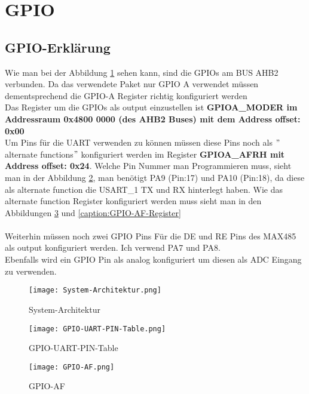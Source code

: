 \newpage
\section{GPIO}
    \subsection{GPIO-Erklärung}
    Wie man bei der Abbildung \ref{caption:System-Architektur} sehen kann, sind die GPIOs am BUS AHB2 verbunden. 
    Da das verwendete Paket nur GPIO A verwendet müssen dementsprechend die GPIO-A Register richtig konfiguriert werden\\
    Das Register um die GPIOs als output einzustellen ist \textbf{GPIOA\_MODER im Addressraum 0x4800 0000 (des AHB2 Buses) mit dem Address offset: 0x00}\\
    Um Pins für die UART verwenden zu können müssen diese Pins noch als $"$alternate functions$"$ konfiguriert werden im Register \textbf{GPIOA\_AFRH mit Address offset: 0x24}.
    Welche Pin Nummer man Programmieren muss, sieht man in der Abbildung \ref{caption:GPIO-UART-PIN-Table}, man benötigt PA9 (Pin:17) und PA10 (Pin:18), da diese als alternate function
    die USART\_1 TX und RX hinterlegt haben. Wie das alternate function Register konfiguriert werden muss sieht man in den Abbildungen \ref{caption:GPIO-AF} 
    und \ref{caption:GPIO-AF-Register}\\\\
    Weiterhin müssen noch zwei GPIO Pins Für die DE und RE Pins des MAX485 als output konfiguriert werden. Ich verwend PA7 und PA8.\\
    Ebenfalls wird ein GPIO Pin als analog konfiguriert um diesen als ADC Eingang zu verwenden. 
    

    \begin{figure}[!htb]
        \centering
        \texttt{[image: System-Architektur.png]}
        \caption{System-Architektur}
        \label{caption:System-Architektur}
    \end{figure}

\newpage
    \begin{figure}[!htb]
        \centering
        \texttt{[image: GPIO-UART-PIN-Table.png]}
        \caption{GPIO-UART-PIN-Table}
        \label{caption:GPIO-UART-PIN-Table}
    \end{figure}

\newpage
    \begin{figure}[!htb]
        \centering
        \texttt{[image: GPIO-AF.png]}
        \caption{GPIO-AF}
        \label{caption:GPIO-AF}
    \end{figure}
    
